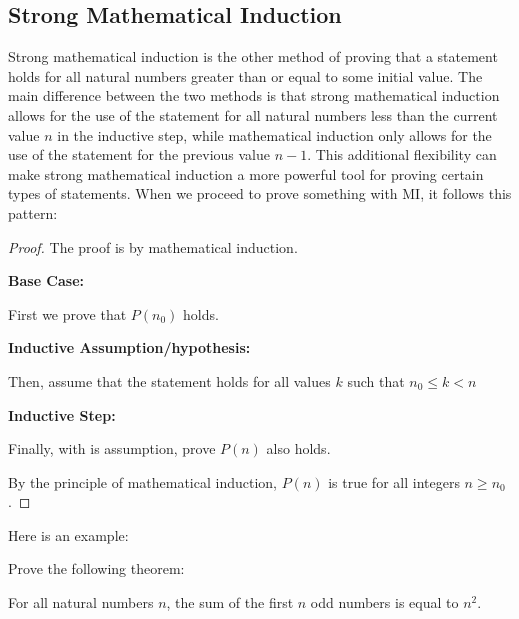 \documentclass[
	12pt, %
	fleqn, %
	a4paper, %
]{LegrandOrangeBook}
\begin{document}
\subsection{Strong Mathematical Induction}
Strong mathematical induction is the other method of proving that a statement holds for all natural numbers greater than or equal to some initial value. The main difference between the two methods is that strong mathematical induction allows for the use of the statement for all natural numbers less than the current value $n$ in the inductive step, while mathematical induction only allows for the use of the statement for the previous value $n-1$. This additional flexibility can make strong mathematical induction a more powerful tool for proving certain types of statements.
When we proceed to prove something with MI, it follows this pattern:
\begin{proof}
The proof is by mathematical induction.

\textbf{Base Case:} 

First we prove that \( P(n_0) \) holds.

\textbf{Inductive Assumption/hypothesis:}

Then,  assume that the statement holds for all values $k$ such that $n_0 \leq k < n$

\textbf{Inductive Step:} 

Finally, with is assumption, prove \( P(n) \) also holds.

By the principle of mathematical induction, \( P(n) \) is true for all integers \( n \geq n_0 \).
\end{proof}
Here is an example:
\begin{example}
Prove the following theorem:
    \begin{theorem}
         For all natural numbers $n$, the sum of the first $n$ odd numbers is equal to $n^2$.
    \end{theorem}
\end{example}
\end{document}
